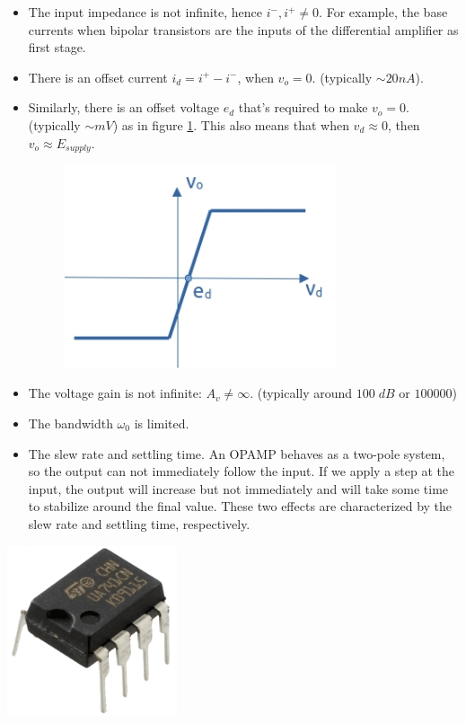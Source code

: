 \begin{itemize}
	\item The input impedance is not infinite, hence $i^-, i^+ \ne 0$. For example, the base currents when bipolar transistors are the inputs of the differential amplifier as first stage.
	\item There is an offset current $i_d = i^+ - i^-$, when $v_o=0$. (typically $\sim 20 nA$). 
	\item Similarly, there is an offset voltage $e_d$ that's required to make $v_o = 0$. (typically $\sim mV$) as in figure \ref{fig:opamp10}. This also means that when $v_d \approx 0$, then $v_o \approx E_{supply}$.
	\begin{figure}[h!]
		\centering
		\includegraphics[width=8cm]{figures/ch02/opamp10.jpg}
		\caption{}
		\label{fig:opamp10}
	\end{figure}
	\item The voltage gain is not infinite: $A_v \ne \infty$. (typically around $100\;dB$ or $100000$)
	\item The bandwidth $\omega_0$ is limited.
	\item The slew rate and settling time. An OPAMP behaves as a two-pole system, so the output can not immediately follow the input. If we apply a step at the input, the output will increase but not immediately and will take some time to stabilize around the final value. These two effects are characterized by the slew rate and settling time, respectively.
\end{itemize}
\begin{minipage}{.5\textwidth}
	\centering
	\includegraphics[width=5cm]{figures/ch02/741_opamp.png}
	\label{fig:741_opamp}
\end{minipage}%
